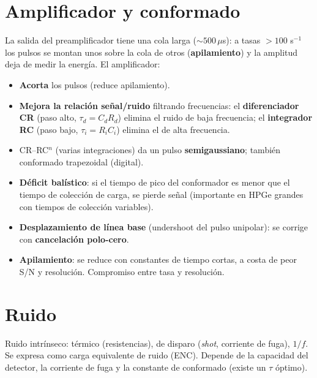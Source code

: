 \section{Amplificador y conformado}
\begin{clave}
La salida del preamplificador tiene una cola larga ($\sim500\,\mu$s): a tasas $>100$ s$^{-1}$ los pulsos se montan unos sobre la cola de otros
(\textbf{apilamiento}) y la amplitud deja de medir la energía. El amplificador:
\begin{itemize}
\item \textbf{Acorta} los pulsos (reduce apilamiento).
\item \textbf{Mejora la relación señal/ruido} filtrando frecuencias: el \textbf{diferenciador CR} (paso alto, $\tau_d=C_dR_d$) elimina el ruido de baja
frecuencia; el \textbf{integrador RC} (paso bajo, $\tau_i=R_iC_i$) elimina el de alta frecuencia.
\item CR--RC$^n$ (varias integraciones) da un pulso \textbf{semigaussiano}; también conformado trapezoidal (digital).
\end{itemize}
\end{clave}
\begin{itemize}
\item \textbf{Déficit balístico}: si el tiempo de pico del conformador es menor que el tiempo de colección de carga, se pierde señal
(importante en HPGe grandes con tiempos de colección variables).
\item \textbf{Desplazamiento de línea base} (undershoot del pulso unipolar): se corrige con \textbf{cancelación polo-cero}.
\item \textbf{Apilamiento}: se reduce con constantes de tiempo cortas, a costa de peor S/N y resolución. Compromiso entre tasa y resolución.
\end{itemize}

\section{Ruido}
Ruido intrínseco: térmico (resistencias), de disparo (\emph{shot}, corriente de fuga), $1/f$. Se expresa como carga equivalente de ruido (ENC).
Depende de la capacidad del detector, la corriente de fuga y la constante de conformado (existe un $\tau$ óptimo).

